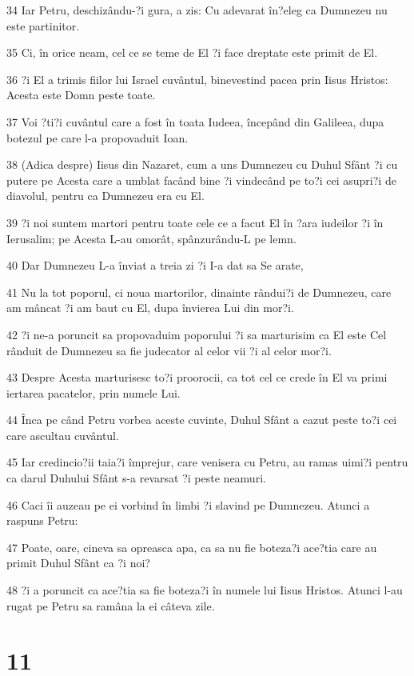 \par 34 Iar Petru, deschizându-?i gura, a zis: Cu adevarat în?eleg ca Dumnezeu nu este partinitor.
\par 35 Ci, în orice neam, cel ce se teme de El ?i face dreptate este primit de El.
\par 36 ?i El a trimis fiilor lui Israel cuvântul, binevestind pacea prin Iisus Hristos: Acesta este Domn peste toate.
\par 37 Voi ?ti?i cuvântul care a fost în toata Iudeea, începând din Galileea, dupa botezul pe care l-a propovaduit Ioan.
\par 38 (Adica despre) Iisus din Nazaret, cum a uns Dumnezeu cu Duhul Sfânt ?i cu putere pe Acesta care a umblat facând bine ?i vindecând pe to?i cei asupri?i de diavolul, pentru ca Dumnezeu era cu El.
\par 39 ?i noi suntem martori pentru toate cele ce a facut El în ?ara iudeilor ?i în Ierusalim; pe Acesta L-au omorât, spânzurându-L pe lemn.
\par 40 Dar Dumnezeu L-a înviat a treia zi ?i I-a dat sa Se arate,
\par 41 Nu la tot poporul, ci noua martorilor, dinainte rândui?i de Dumnezeu, care am mâncat ?i am baut cu El, dupa învierea Lui din mor?i.
\par 42 ?i ne-a poruncit sa propovaduim poporului ?i sa marturisim ca El este Cel rânduit de Dumnezeu sa fie judecator al celor vii ?i al celor mor?i.
\par 43 Despre Acesta marturisesc to?i proorocii, ca tot cel ce crede în El va primi iertarea pacatelor, prin numele Lui.
\par 44 Înca pe când Petru vorbea aceste cuvinte, Duhul Sfânt a cazut peste to?i cei care ascultau cuvântul.
\par 45 Iar credincio?ii taia?i împrejur, care venisera cu Petru, au ramas uimi?i pentru ca darul Duhului Sfânt s-a revarsat ?i peste neamuri.
\par 46 Caci îi auzeau pe ei vorbind în limbi ?i slavind pe Dumnezeu. Atunci a raspuns Petru:
\par 47 Poate, oare, cineva sa opreasca apa, ca sa nu fie boteza?i ace?tia care au primit Duhul Sfânt ca ?i noi?
\par 48 ?i a poruncit ca ace?tia sa fie boteza?i în numele lui Iisus Hristos. Atunci l-au rugat pe Petru sa ramâna la ei câteva zile.

\chapter{11}

